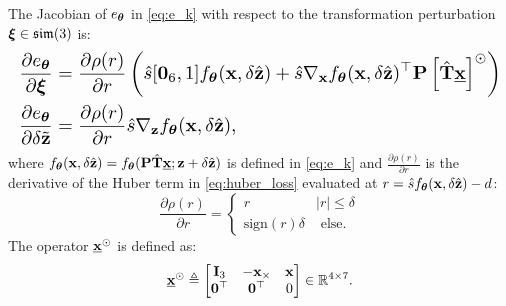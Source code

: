 \begin{proposition}
\label{prop:sdf-sim3-jacobians}
The Jacobian of $e_{\boldsymbol{\theta}}$ in \eqref{eq:e_k} with respect to the transformation perturbation $\boldsymbol{\xi} \in \mathfrak{sim}(3)$ is:
\begin{equation*}
\scaleMathLine[1]
{
  \begin{aligned}
    \frac{\partial e_{\bftheta}}{\partial \bfxi} 
    &= 
    \frac{\partial \rho(r)}{\partial r}
    \prl{
      \hat{s} [{\bf0}_6,1] f_{\bftheta} (\bfx,\delta\hat{\bfz})
      + 
      \hat{s} \nabla_{\bfx} f_{\bftheta}(\bfx,\delta\hat{\bfz})^\top
      \bfP \brl{\hat{\bfT} \underline{\bfx}}^\odot 
    }
    \\
    \frac{\partial e_{\bftheta}}{\partial \delta\tilde{\bfz}} 
    &= 
    \frac{\partial \rho(r)}{\partial r}
    \hat{s} \nabla_{\bfz} f_{\bftheta}(\bfx,\delta\hat{\bfz}), 
    \end{aligned}
}
\end{equation*}
where $f_{\boldsymbol{\theta}}(\mathbf{x},\delta\hat{\mathbf{z}}) = f_{\boldsymbol{\theta}}(\mathbf{P}\hat{\mathbf{T}} \underline{\mathbf{x}}; \mathbf{z}+\delta\hat{\mathbf{z}})$ is defined in \eqref{eq:e_k} and $\frac{\partial \rho(r)}{\partial r}$ is the derivative of the Huber term in \eqref{eq:huber_loss} evaluated at $r = \hat{s} f_{\boldsymbol{\theta}}(\mathbf{x},\delta\hat{\mathbf{z}}) - d$:
\[
  \frac{\partial \rho(r)}{\partial r}
  =\left\{\begin{array}{ll}
    r & |r| \leq \delta \\
    \text{sign}(r)\delta  & \text{ else}. 
    \end{array}\right.
\] 
The operator $\underline{\mathbf{x}}^\odot$ is defined as:
\begin{equation*}
\underline{\mathbf{x}}^\odot \triangleq \begin{bmatrix} \mathbf{I}_3 & -\mathbf{x}_\times & \mathbf{x}\\ \mathbf{0}^\top & \mathbf{0}^\top & 0 \end{bmatrix} \in \mathbb{R}^{4 \times 7}. 
\end{equation*}
\end{proposition}

